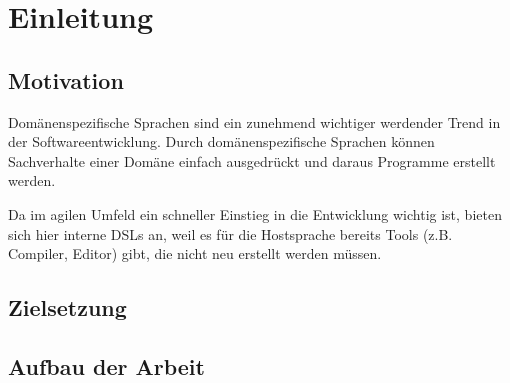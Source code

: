 \documentclass[../find-a-part.tex]{subfiles}
\begin{document}
\chapter{Einleitung}


\section{Motivation}
Domänenspezifische Sprachen sind ein zunehmend wichtiger werdender Trend in der Softwareentwicklung. Durch domänenspezifische Sprachen können Sachverhalte einer Domäne einfach ausgedrückt und daraus Programme erstellt werden. 

Da im agilen Umfeld ein schneller Einstieg in die Entwicklung wichtig ist, bieten sich hier interne \acsp{DSL} an, weil es für die Hostsprache bereits Tools (z.B. Compiler, Editor) gibt, die nicht neu erstellt werden müssen.

\section{Zielsetzung}


\section{Aufbau der Arbeit}
\end{document}
